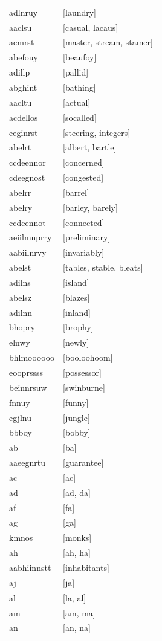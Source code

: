 \documentclass{article}
\begin{document}
\begin{tabular}{ll}
adlnruy & [laundry] \\
aaclsu & [casual, lacaus] \\
aemrst & [master, stream, stamer] \\
abefouy & [beaufoy] \\
adillp & [pallid] \\
abghint & [bathing] \\
aacltu & [actual] \\
acdellos & [socalled] \\
eeginrst & [steering, integers] \\
abelrt & [albert, bartle] \\
ccdeennor & [concerned] \\
cdeegnost & [congested] \\
abelrr & [barrel] \\
abelry & [barley, barely] \\
ccdeennot & [connected] \\
aeiilmnprry & [preliminary] \\
aabiilnrvy & [invariably] \\
abelst & [tables, stable, bleats] \\
adilns & [island] \\
abelsz & [blazes] \\
adilnn & [inland] \\
bhopry & [brophy] \\
elnwy & [newly] \\
bhlmoooooo & [booloohoom] \\
eooprssss & [possessor] \\
beinnrsuw & [swinburne] \\
fnnuy & [funny] \\
egjlnu & [jungle] \\
bbboy & [bobby] \\
ab & [ba] \\
aaeegnrtu & [guarantee] \\
ac & [ac] \\
ad & [ad, da] \\
af & [fa] \\
ag & [ga] \\
kmnos & [monks] \\
ah & [ah, ha] \\
aabhiinnstt & [inhabitants] \\
aj & [ja] \\
al & [la, al] \\
am & [am, ma] \\
an & [an, na] \\

\end{tabular}
\end{document}
